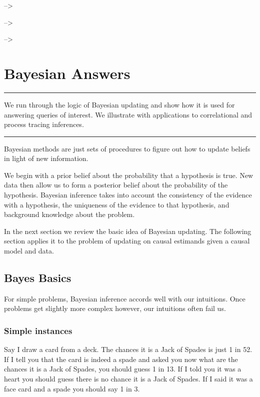 \documentclass[12pt,]{book}
\begin{document}
--\textgreater{}

--\textgreater{}

--\textgreater{}

\hypertarget{bayeschapter}{%
\chapter{Bayesian Answers}\label{bayeschapter}}

\begin{center}\rule{0.5\linewidth}{\linethickness}\end{center}

We run through the logic of Bayesian updating and show how it is used for answering queries of interest. We illustrate with applications to correlational and process tracing inferences.

\begin{center}\rule{0.5\linewidth}{\linethickness}\end{center}

Bayesian methods are just sets of procedures to figure out how to update beliefs in light of new information.

We begin with a prior belief about the probability that a hypothesis is true. New data then allow us to form a posterior belief about the probability of the hypothesis. Bayesian inference takes into account the consistency of the evidence with a hypothesis, the uniqueness of the evidence to that hypothesis, and background knowledge about the problem.

In the next section we review the basic idea of Bayesian updating. The following section applies it to the problem of updating on causal estimands given a causal model and data.

\hypertarget{bayes-basics}{%
\section{Bayes Basics}\label{bayes-basics}}

For simple problems, Bayesian inference accords well with our intuitions. Once problems get slightly more complex however, our intuitions often fail us.

\hypertarget{simple-instances}{%
\subsection{Simple instances}\label{simple-instances}}

Say I draw a card from a deck. The chances it is a Jack of Spades is just 1 in 52. If I tell you that the card is indeed a spade and asked you now what are the chances it is a Jack of Spades, you should guess 1 in 13. If I told you it was a heart you should guess there is no chance it is a Jack of Spades. If I said it was a face card and a spade you should say 1 in 3.
\end{document}

